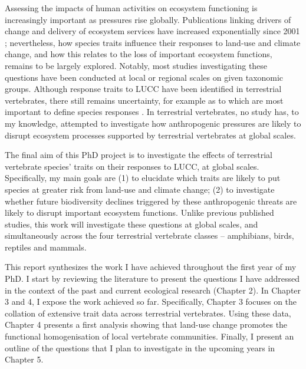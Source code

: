 Assessing the impacts of human activities on ecosystem functioning is increasingly important as pressures rise globally. Publications linking drivers of change and delivery of ecosystem services have increased exponentially since 2001 \citep{Hevia2017}; nevertheless, how species traits influence their responses to land-use and climate change, and how this relates to the loss of important ecosystem functions, remains to be largely explored.  Notably, most studies investigating these questions have been conducted at local or regional scales on given taxonomic groups. Although response traits to LUCC have been identified in terrestrial vertebrates, there still remains uncertainty, for example as to which are most important to define species responses \citep{Wheatley2017}. In terrestrial vertebrates, no study has, to my knowledge, attempted to investigate how anthropogenic pressures are likely to disrupt ecosystem processes supported by terrestrial vertebrates at global scales.
 
The final aim of this PhD project is to investigate the effects of terrestrial vertebrate species’ traits on their responses to LUCC, at global scales. Specifically, my main goals are (1) to elucidate which traits are likely to put species at greater risk from land-use and climate change; (2) to investigate whether future biodiversity declines triggered by these anthropogenic threats are likely to disrupt important ecosystem functions. Unlike previous published studies, this work will investigate these questions at global scales, and simultaneously across the four terrestrial vertebrate classes – amphibians, birds, reptiles and mammals.  

This report synthesizes the work I have achieved throughout the first year of my PhD. I start by reviewing the literature to present the questions I have addressed in the context of the past and current ecological research (Chapter 2). In Chapter 3 and 4, I expose the work achieved so far. Specifically, Chapter 3 focuses on the collation of extensive trait data across terrestrial vertebrates. Using these data, Chapter 4 presents a first analysis showing that land-use change promotes the functional homogenisation of local vertebrate communities. Finally, I present an outline of the questions that I plan to investigate in the upcoming years in Chapter 5.

